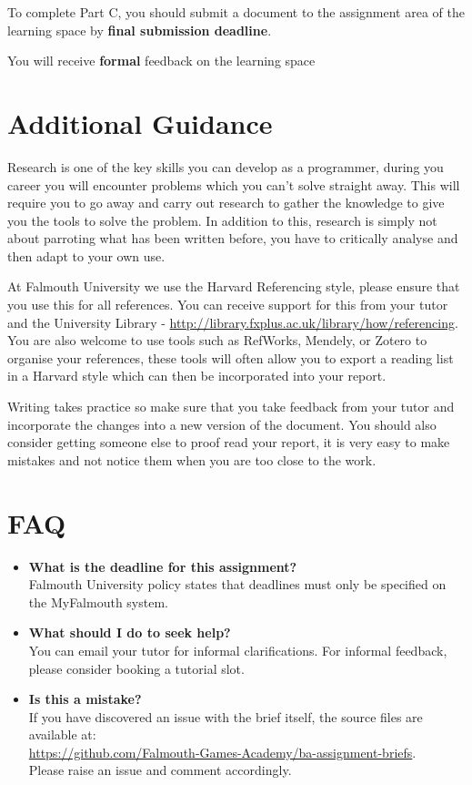 \documentclass{../../fal_assignment}
\begin{document}
To complete Part C, you should submit a document to the assignment area of the learning space by \textbf{final submission deadline}.

You will receive \textbf{formal} feedback on the learning space

\section*{Additional Guidance}
Research is one of the key skills you can develop as a programmer, during you career you will encounter problems which you can't solve straight away. This will require you to go away and carry out research to gather the knowledge to give you the tools to solve the problem. In addition to this, research is simply not about parroting what has been written before, you have to critically analyse and then adapt to your own use.

At Falmouth University we use the Harvard Referencing style, please ensure that you use this  for all references. You can receive support for this from your tutor and the University Library - \url{http://library.fxplus.ac.uk/library/how/referencing}. You are also welcome to use tools such as RefWorks, Mendely, or Zotero to organise your references, these tools will often allow you to export a reading list in a Harvard style which can then be incorporated into your report.

Writing takes practice so make sure that you take feedback from your tutor and incorporate the changes into a new version of the document. You should also consider getting someone else to proof read your report, it is very easy to make mistakes and not notice them when you are too close to the work.

\section*{FAQ}

\begin{itemize}
	\item 	\textbf{What is the deadline for this assignment?} \\ 
    		Falmouth University policy states that deadlines must only be specified on the MyFalmouth system.
    		
	\item 	\textbf{What should I do to seek help?} \\ 
    		You can email your tutor for informal clarifications. For informal feedback, please consider booking a tutorial slot.
    		
    	\item 	\textbf{Is this a mistake?} \\ 	
    		If you have discovered an issue with the brief itself, the source files are available at: \\
    		\url{https://github.com/Falmouth-Games-Academy/ba-assignment-briefs}.\\
    		 Please raise an issue and comment accordingly.
\end{itemize}
\end{document}
